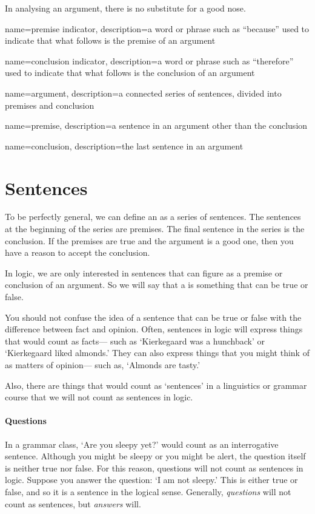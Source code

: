 In analysing an argument, there is no substitute for a good nose. 

{
name=premise indicator,
description={a word or phrase such as ``because'' used to indicate that what follows is the premise of an argument}
}

{
name=conclusion indicator,
description={a word or phrase such as ``therefore'' used to indicate that what follows is the conclusion of an argument}
}

{
name=argument,
description={a connected series of sentences, divided into \gls{premise}s and \gls{conclusion}}
}

{
name=premise,
description={a sentence in an \gls{argument} other than the \gls{conclusion}}
}

{
name=conclusion,
description={the last sentence in an \gls{argument}}
}


\section{Sentences}
\label{intro.sentences}

To be perfectly general, we can define an  as a series of sentences. The sentences at the beginning of the series are premises. The final sentence in the series is the conclusion. If the premises are true and the argument is a good one, then you have a reason to accept the conclusion.

In logic, we are only interested in sentences that can figure as a premise or conclusion of an argument. So we will say that a  is something that can be true or false.

You should not confuse the idea of a sentence that can be true or false with the difference between fact and opinion. Often, sentences in logic will express things that would count as facts--- such as `Kierkegaard was a hunchback' or `Kierkegaard liked almonds.' They can also express things that you might think of as matters of opinion--- such as, `Almonds are tasty.'

Also, there are things that would count as `sentences' in a linguistics or grammar course that we will not count as sentences in logic.

\paragraph{Questions} In a grammar class, `Are you sleepy yet?' would count as an interrogative sentence. Although you might be sleepy or you might be alert, the question itself is neither true nor false. For this reason, questions will not count as sentences in logic. Suppose you answer the question: `I am not sleepy.' This is either true or false, and so it is a sentence in the logical sense. Generally, \emph{questions} will not count as sentences, but \emph{answers} will. 

